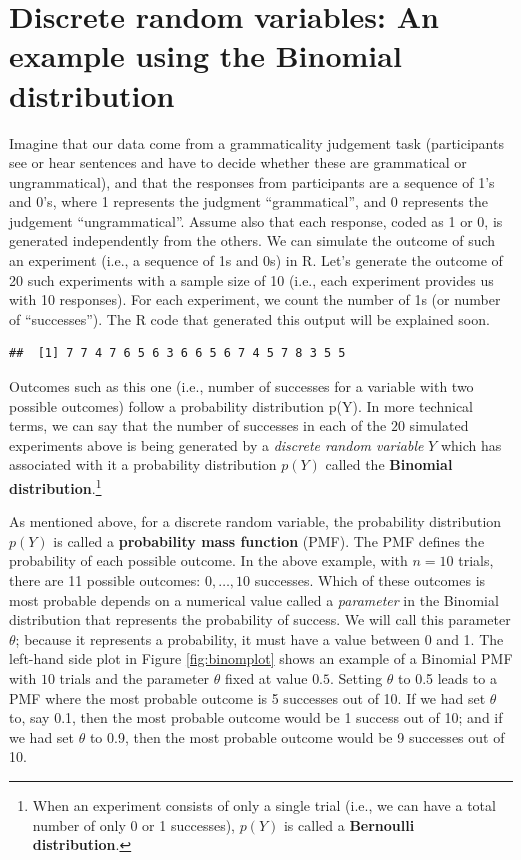 \documentclass[
  12pt,
]{krantz}
\theoremstyle{definition}
\theoremstyle{definition}
\theoremstyle{definition}
\theoremstyle{definition}
\theoremstyle{remark}
\begin{document}
\hypertarget{discrete-random-variables-an-example-using-the-binomial-distribution}{%
\section{Discrete random variables: An example using the Binomial distribution}\label{discrete-random-variables-an-example-using-the-binomial-distribution}}

Imagine that our data come from a grammaticality judgement task (participants see or hear sentences and have to decide whether these are grammatical or ungrammatical), and that the responses from participants are a sequence of 1's and 0's, where 1 represents the judgment ``grammatical'', and 0 represents the judgement ``ungrammatical''. Assume also that each response, coded as 1 or 0, is generated independently from the others. We can simulate the outcome of such an experiment (i.e., a sequence of 1s and 0s) in R. Let's generate the outcome of 20 such experiments with a sample size of 10 (i.e., each experiment provides us with 10 responses). For each experiment, we count the number of 1s (or number of ``successes''). The R code that generated this output will be explained soon.

\begin{verbatim}
##  [1] 7 7 4 7 6 5 6 3 6 6 5 6 7 4 5 7 8 3 5 5
\end{verbatim}

Outcomes such as this one (i.e., number of successes for a variable with two possible outcomes) follow a probability distribution p(Y). In more technical terms, we can say that the number of successes in each of the \(20\) simulated experiments above is being generated by a \emph{discrete random variable} \(Y\) which has associated with it a probability distribution \(p(Y)\) called the \textbf{Binomial distribution}.\footnote{When an experiment consists of only a single trial (i.e., we can have a total number of only 0 or 1 successes), \(p(Y)\) is called a \textbf{Bernoulli distribution}.}

As mentioned above, for a discrete random variable, the probability distribution \(p(Y)\) is called a \textbf{probability mass function} (PMF). The PMF defines the probability of each possible outcome. In the above example, with \(n=10\) trials, there are 11 possible outcomes: \(0,\dots,10\) successes. Which of these outcomes is most probable depends on a numerical value called a \emph{parameter} in the Binomial distribution that represents the probability of success. We will call this parameter \(\theta\); because it represents a probability, it must have a value between 0 and 1. The left-hand side plot in Figure \ref{fig:binomplot} shows an example of a Binomial PMF with \(10\) trials and the parameter \(\theta\) fixed at value \(0.5\). Setting \(\theta\) to 0.5 leads to a PMF where the most probable outcome is 5 successes out of 10. If we had set \(\theta\) to, say 0.1, then the most probable outcome would be 1 success out of 10; and if we had set \(\theta\) to 0.9, then the most probable outcome would be 9 successes out of 10.
\end{document}
